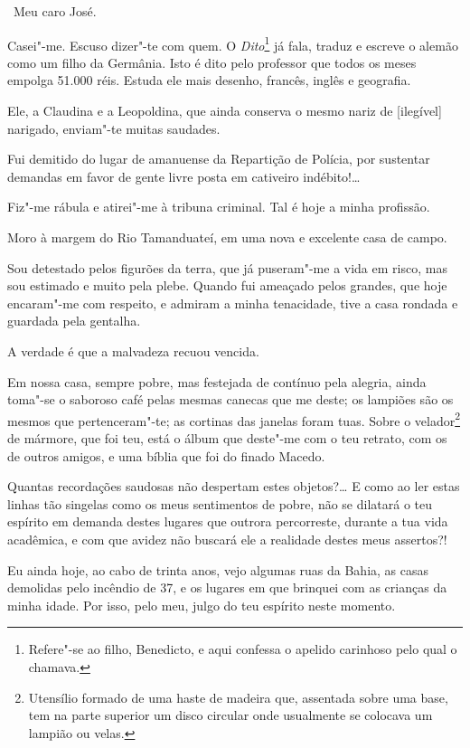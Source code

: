 \asterisc

\noindent\ Meu caro José.\smallskip


Casei"-me. Escuso dizer"-te com quem. O \emph{Dito}\footnote{Refere"-se
  ao filho, Benedicto, e aqui confessa o apelido carinhoso pelo qual o
  chamava.} já fala, traduz e escreve o alemão como um filho da
Germânia. Isto é dito pelo professor que todos os meses empolga 51.000
réis. Estuda ele mais desenho, francês, inglês e geografia.

Ele, a Claudina e a Leopoldina, que ainda conserva o mesmo nariz de
{[}ilegível{]} narigado, enviam"-te muitas saudades.

Fui demitido do lugar de amanuense da Repartição de Polícia, por
sustentar demandas em favor de gente livre posta em cativeiro
indébito!\ldots{}

Fiz"-me rábula e atirei"-me à tribuna criminal. Tal é hoje a minha
profissão.

Moro à margem do Rio Tamanduateí, em uma nova e excelente casa de campo.

Sou detestado pelos figurões da terra, que já puseram"-me a vida em
risco, mas sou estimado e muito pela plebe. Quando fui ameaçado pelos
grandes, que hoje encaram"-me com respeito, e admiram a minha tenacidade,
tive a casa rondada e guardada pela gentalha.

A verdade é que a malvadeza recuou vencida.

Em nossa casa, sempre pobre, mas festejada de contínuo pela alegria,
ainda toma"-se o saboroso café pelas mesmas canecas que me deste; os
lampiões são os mesmos que pertenceram"-te; as cortinas das janelas foram
tuas. Sobre o velador\footnote{Utensílio formado de uma haste de
  madeira que, assentada sobre uma base, tem na parte superior um disco
  circular onde usualmente se colocava um lampião ou velas.} de mármore,
que foi teu, está o álbum que deste"-me com o teu retrato, com os de
outros amigos, e uma bíblia que foi do finado Macedo.

Quantas recordações saudosas não despertam estes objetos?\ldots{} E como ao
ler estas linhas tão singelas como os meus sentimentos de pobre, não se
dilatará o teu espírito em demanda destes lugares que outrora
percorreste, durante a tua vida acadêmica, e com que avidez não buscará
ele a realidade destes meus assertos?!

Eu ainda hoje, ao cabo de trinta anos, vejo algumas ruas da Bahia, as
casas demolidas pelo incêndio de 37, e os lugares em que brinquei com as
crianças da minha idade. Por isso, pelo meu, julgo do teu espírito neste
momento.

